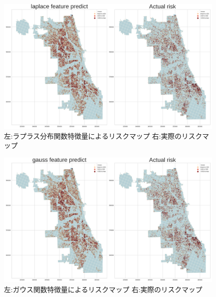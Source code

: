 \documentclass[12pt,a4paper,oneside]{jsbook}
\theoremstyle{plain}
\begin{document}
\begin{figure}
  \centering %
  \includegraphics[scale=0.25]{./non-crime-val-figure/laplace_riskmap.png}
  \caption{左:ラプラス分布関数特徴量によるリスクマップ 右:実際のリスクマップ}
  \label{fig:nc-val-laplace}
\end{figure}

\begin{figure}
  \centering %
  \includegraphics[scale=0.25]{./non-crime-val-figure/gauss_riskmap.png}
  \caption{左:ガウス関数特徴量によるリスクマップ 右:実際のリスクマップ}
  \label{fig:nc-val-gauss}
\end{figure}
\end{document}
